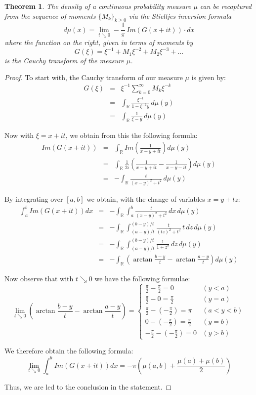 \documentclass[12pt]{amsbook}
\newtheorem{theorem}{Theorem}[chapter]
\begin{document}
\begin{theorem}
The density of a continuous probability measure $\mu$ can be recaptured from the sequence of moments $\{M_k\}_{k\geq0}$ via the Stieltjes inversion formula
$$d\mu (x)=\lim_{t\searrow 0}-\frac{1}{\pi}\,Im\left(G(x+it)\right)\cdot dx$$
where the function on the right, given in terms of moments by
$$G(\xi)=\xi^{-1}+M_1\xi^{-2}+M_2\xi^{-3}+\ldots$$
is the Cauchy transform of the measure $\mu$.
\end{theorem}

\begin{proof}
To start with, the Cauchy transform of our measure $\mu$ is given by:
\begin{eqnarray*}
G(\xi)
&=&\xi^{-1}\sum_{k=0}^\infty M_k\xi^{-k}\\\
&=&\int_\mathbb R\frac{\xi^{-1}}{1-\xi^{-1}y}\,d\mu(y)\\
&=&\int_\mathbb R\frac{1}{\xi-y}\,d\mu(y)
\end{eqnarray*}

Now with $\xi=x+it$, we obtain from this the following formula:
\begin{eqnarray*}
Im(G(x+it))
&=&\int_\mathbb RIm\left(\frac{1}{x-y+it}\right)d\mu(y)\\
&=&\int_\mathbb R\frac{1}{2i}\left(\frac{1}{x-y+it}-\frac{1}{x-y-it}\right)d\mu(y)\\
&=&-\int_\mathbb R\frac{t}{(x-y)^2+t^2}\,d\mu(y)
\end{eqnarray*}

By integrating over $[a,b]$ we obtain, with the change of variables $x=y+tz$:
\begin{eqnarray*}
\int_a^bIm(G(x+it))dx
&=&-\int_\mathbb R\int_a^b\frac{t}{(x-y)^2+t^2}\,dx\,d\mu(y)\\
&=&-\int_\mathbb R\int_{(a-y)/t}^{(b-y)/t}\frac{t}{(tz)^2+t^2}\,t\,dz\,d\mu(y)\\
&=&-\int_\mathbb R\int_{(a-y)/t}^{(b-y)/t}\frac{1}{1+z^2}\,dz\,d\mu(y)\\
&=&-\int_\mathbb R\left(\arctan\frac{b-y}{t}-\arctan\frac{a-y}{t}\right)d\mu(y)
\end{eqnarray*}

Now observe that with $t\searrow0$ we have the following formulae:
$$\lim_{t\searrow0}\left(\arctan\frac{b-y}{t}-\arctan\frac{a-y}{t}\right)
=\begin{cases}
\frac{\pi}{2}-\frac{\pi}{2}=0& (y<a)\\
\frac{\pi}{2}-0=\frac{\pi}{2}& (y=a)\\
\frac{\pi}{2}-(-\frac{\pi}{2})=\pi& (a<y<b)\\
0-(-\frac{\pi}{2})=\frac{\pi}{2}& (y=b)\\
-\frac{\pi}{2}-(-\frac{\pi}{2})=0& (y>b)
\end{cases}$$

We therefore obtain the following formula:
$$\lim_{t\searrow0}\int_a^bIm(G(x+it))dx=-\pi\left(\mu(a,b)+\frac{\mu(a)+\mu(b)}{2}\right)$$

Thus, we are led to the conclusion in the statement.
\end{proof}
\end{document}
